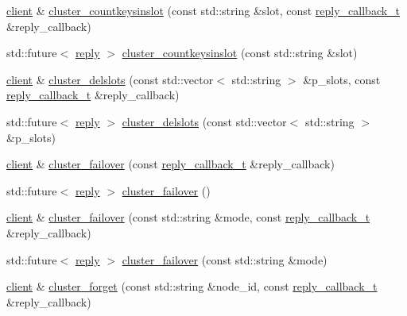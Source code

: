 \begin{DoxyCompactItemize}
\item 
\hyperlink{classcpp__redis_1_1client}{client} \& \hyperlink{classcpp__redis_1_1client_a78017860625d016074d0495c24c3f9e8}{cluster\+\_\+countkeysinslot} (const std\+::string \&slot, const \hyperlink{classcpp__redis_1_1client_a061a1140d36d2eaeda82b09a0bb3f9f2}{reply\+\_\+callback\+\_\+t} \&reply\+\_\+callback)
\item 
std\+::future$<$ \hyperlink{classcpp__redis_1_1reply}{reply} $>$ \hyperlink{classcpp__redis_1_1client_a8135eee3cfc95b061aee9b6f7271efce}{cluster\+\_\+countkeysinslot} (const std\+::string \&slot)
\item 
\hyperlink{classcpp__redis_1_1client}{client} \& \hyperlink{classcpp__redis_1_1client_a41f96bb9a627724570f1866d0983d7b2}{cluster\+\_\+delslots} (const std\+::vector$<$ std\+::string $>$ \&p\+\_\+slots, const \hyperlink{classcpp__redis_1_1client_a061a1140d36d2eaeda82b09a0bb3f9f2}{reply\+\_\+callback\+\_\+t} \&reply\+\_\+callback)
\item 
std\+::future$<$ \hyperlink{classcpp__redis_1_1reply}{reply} $>$ \hyperlink{classcpp__redis_1_1client_a6cd07520f60ee78c4603211273adcf46}{cluster\+\_\+delslots} (const std\+::vector$<$ std\+::string $>$ \&p\+\_\+slots)
\item 
\hyperlink{classcpp__redis_1_1client}{client} \& \hyperlink{classcpp__redis_1_1client_a5afcee001e210150803a95c3d6412998}{cluster\+\_\+failover} (const \hyperlink{classcpp__redis_1_1client_a061a1140d36d2eaeda82b09a0bb3f9f2}{reply\+\_\+callback\+\_\+t} \&reply\+\_\+callback)
\item 
std\+::future$<$ \hyperlink{classcpp__redis_1_1reply}{reply} $>$ \hyperlink{classcpp__redis_1_1client_a76122bb138c12b90c78c4e511f45ef17}{cluster\+\_\+failover} ()
\item 
\hyperlink{classcpp__redis_1_1client}{client} \& \hyperlink{classcpp__redis_1_1client_a9c95de64e422c09c2180dc69db386d06}{cluster\+\_\+failover} (const std\+::string \&mode, const \hyperlink{classcpp__redis_1_1client_a061a1140d36d2eaeda82b09a0bb3f9f2}{reply\+\_\+callback\+\_\+t} \&reply\+\_\+callback)
\item 
std\+::future$<$ \hyperlink{classcpp__redis_1_1reply}{reply} $>$ \hyperlink{classcpp__redis_1_1client_a06f9c7d27f961787b01a01be95f1fa29}{cluster\+\_\+failover} (const std\+::string \&mode)
\item 
\hyperlink{classcpp__redis_1_1client}{client} \& \hyperlink{classcpp__redis_1_1client_aea8a77acb9031fd03f8ab5dc2c09a17d}{cluster\+\_\+forget} (const std\+::string \&node\+\_\+id, const \hyperlink{classcpp__redis_1_1client_a061a1140d36d2eaeda82b09a0bb3f9f2}{reply\+\_\+callback\+\_\+t} \&reply\+\_\+callback)

\end{DoxyCompactItemize}
